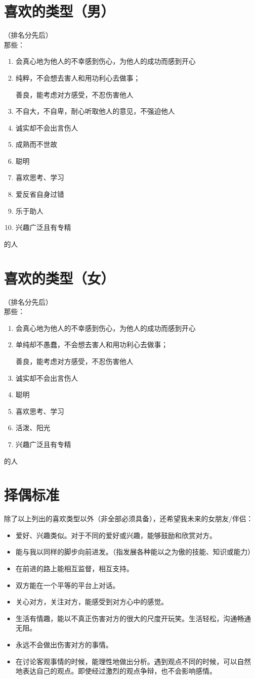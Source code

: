 \documentclass[UTF8]{ctexart}
\begin{document}
\section{喜欢的类型（男）}
\noindent （排名分先后）\\
那些：
\begin{enumerate}[1.]
\item 会真心地为他人的不幸感到伤心，为他人的成功而感到开心
\item 纯粹，不会想去害人和用功利心去做事；

善良，能考虑对方感受，不忍伤害他人
\item 不自大，不自卑，耐心听取他人的意见，不强迫他人
\item 诚实却不会出言伤人
\item 成熟而不世故
\item 聪明
\item 喜欢思考、学习
\item 爱反省自身过错
\item 乐于助人
\item 兴趣广泛且有专精
\end{enumerate}
的人
\section{喜欢的类型（女）}
\noindent （排名分先后）\\
那些：
\begin{enumerate}[1.]
\item 会真心地为他人的不幸感到伤心，为他人的成功而感到开心
\item 单纯却不愚蠢，不会想去害人和用功利心去做事；

善良，能考虑对方感受，不忍伤害他人
\item 诚实却不会出言伤人
\item 聪明
\item 喜欢思考、学习
\item 活泼、阳光
\item 兴趣广泛且有专精
\end{enumerate}
的人
\section{择偶标准}
除了以上列出的喜欢类型以外（非全部必须具备），还希望我未来的女朋友/伴侣：
\begin{itemize}
\item 爱好、兴趣类似。对于不同的爱好或兴趣，能够鼓励和欣赏对方。
\item 能与我以同样的脚步向前进发。（指发展各种能以之为傲的技能、知识或能力）
\item 在前进的路上能相互监督，相互支持。
\item 双方能在一个平等的平台上对话。
\item 关心对方，关注对方，能感受到对方心中的感觉。
\item 生活有情趣，能以不真正伤害对方的很大的尺度开玩笑。生活轻松，沟通畅通无阻。
\item 永远不会做出伤害对方的事情。
\item 在讨论客观事情的时候，能理性地做出分析。遇到观点不同的时候，可以自然地表达自己的观点。即使经过激烈的观点争辩，也不会影响感情。
\end{itemize}
\end{document}
